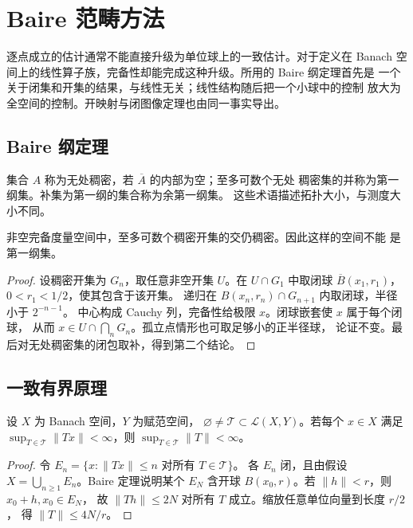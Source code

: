 \chapter{Baire 范畴方法}
\label{chap:baire-method}

逐点成立的估计通常不能直接升级为单位球上的一致估计。对于定义在 Banach
空间上的线性算子族，完备性却能完成这种升级。所用的 Baire 纲定理首先是
一个关于闭集和开集的结果，与线性无关；线性结构随后把一个小球中的控制
放大为全空间的控制。开映射与闭图像定理也由同一事实导出。

\section{Baire 纲定理}

集合 \(A\) 称为无处稠密，若 \(\overline A\) 的内部为空；至多可数个无处
稠密集的并称为第一纲集。补集为第一纲的集合称为余第一纲集。
这些术语描述拓扑大小，与测度大小不同。

\begin{theorem}[Baire]\label{thm:baire-complete}
非空完备度量空间中，至多可数个稠密开集的交仍稠密。因此这样的空间不能
是第一纲集。
\end{theorem}
\begin{proof}
设稠密开集为 \(G_n\)，取任意非空开集 \(U\)。在 \(U\cap G_1\) 中取闭球
\(\overline B(x_1,r_1)\)，\(0<r_1<1/2\)，使其包含于该开集。
递归在 \(B(x_n,r_n)\cap G_{n+1}\) 内取闭球，半径小于 \(2^{-n-1}\)。
中心构成 Cauchy 列，完备性给极限 \(x\)。闭球嵌套使 \(x\) 属于每个闭球，
从而 \(x\in U\cap\bigcap_nG_n\)。孤立点情形也可取足够小的正半径球，
论证不变。最后对无处稠密集的闭包取补，得到第二个结论。
\end{proof}

\section{一致有界原理}

\begin{theorem}\label{thm:uniform-boundedness}
设 \(X\) 为 Banach 空间，\(Y\) 为赋范空间，
\(\varnothing\ne\mathcal T\subset\mathcal L(X,Y)\)。若每个 \(x\in X\) 满足
\(\sup_{T\in\mathcal T}\|Tx\|<\infty\)，则 \(\sup_{T\in\mathcal T}\|T\|<\infty\)。
\end{theorem}
\begin{proof}
令 \(E_n=\{x:\|Tx\|\le n\text{ 对所有 }T\in\mathcal T\}\)。
各 \(E_n\) 闭，且由假设 \(X=\bigcup_{n\ge1}E_n\)。Baire 定理说明某个
\(E_N\) 含开球 \(B(x_0,r)\)。若 \(\|h\|<r\)，则 \(x_0+h,x_0\in E_N\)，
故 \(\|Th\|\le2N\) 对所有 \(T\) 成立。缩放任意单位向量到长度 \(r/2\)，
得 \(\|T\|\le4N/r\)。
\end{proof}

